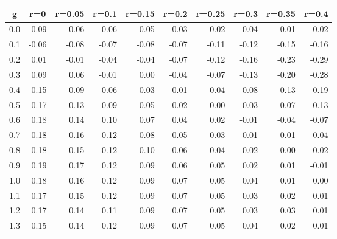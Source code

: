 %
\begin{table}[!tbp]
 \begin{center}
 \begin{tabular}{rrrrrrrrrr}\hline\hline
\multicolumn{1}{c}{g}&\multicolumn{1}{c}{r=0}&\multicolumn{1}{c}{r=0.05}&\multicolumn{1}{c}{r=0.1}&\multicolumn{1}{c}{r=0.15}&\multicolumn{1}{c}{r=0.2}&\multicolumn{1}{c}{r=0.25}&\multicolumn{1}{c}{r=0.3}&\multicolumn{1}{c}{r=0.35}&\multicolumn{1}{c}{r=0.4}\tabularnewline
\hline
0.0&-0.09&-0.06&-0.06&-0.05&-0.03&-0.02&-0.04&-0.01&-0.02\tabularnewline
0.1&-0.06&-0.08&-0.07&-0.08&-0.07&-0.11&-0.12&-0.15&-0.16\tabularnewline
0.2& 0.01&-0.01&-0.04&-0.04&-0.07&-0.12&-0.16&-0.23&-0.29\tabularnewline
0.3& 0.09& 0.06&-0.01& 0.00&-0.04&-0.07&-0.13&-0.20&-0.28\tabularnewline
0.4& 0.15& 0.09& 0.06& 0.03&-0.01&-0.04&-0.08&-0.13&-0.19\tabularnewline
0.5& 0.17& 0.13& 0.09& 0.05& 0.02& 0.00&-0.03&-0.07&-0.13\tabularnewline
0.6& 0.18& 0.14& 0.10& 0.07& 0.04& 0.02&-0.01&-0.04&-0.07\tabularnewline
0.7& 0.18& 0.16& 0.12& 0.08& 0.05& 0.03& 0.01&-0.01&-0.04\tabularnewline
0.8& 0.18& 0.15& 0.12& 0.10& 0.06& 0.04& 0.02& 0.00&-0.02\tabularnewline
0.9& 0.19& 0.17& 0.12& 0.09& 0.06& 0.05& 0.02& 0.01&-0.01\tabularnewline
1.0& 0.18& 0.16& 0.12& 0.09& 0.07& 0.05& 0.04& 0.01& 0.00\tabularnewline
1.1& 0.17& 0.15& 0.12& 0.09& 0.07& 0.05& 0.03& 0.02& 0.01\tabularnewline
1.2& 0.17& 0.14& 0.11& 0.09& 0.07& 0.05& 0.03& 0.03& 0.01\tabularnewline
1.3& 0.15& 0.14& 0.12& 0.09& 0.07& 0.05& 0.04& 0.02& 0.01\tabularnewline
\hline
\end{tabular}

\end{center}

\end{table}

